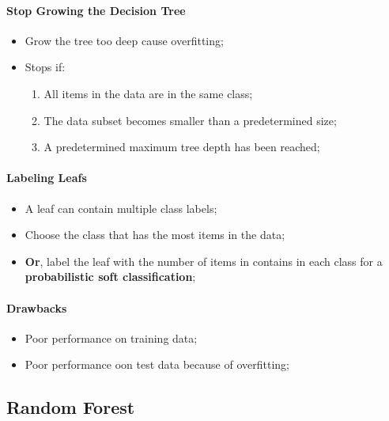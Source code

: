       \paragraph{Stop Growing the Decision Tree}
      \begin{itemize}
        \item Grow the tree too deep cause overfitting;
        \item Stops if:
        \begin{enumerate}
          \item All items in the data are in the same class;
          \item The data subset becomes smaller than a predetermined size;
          \item A predetermined maximum tree depth has been reached;
        \end{enumerate}
      \end{itemize}
      
      \paragraph{Labeling Leafs}
      \begin{itemize}
        \item A leaf can contain multiple class labels;
        \item Choose the class that has the most items in the data;
        \item \textbf{Or}, label the leaf with the number of items in contains in each class for a \textbf{probabilistic soft classification};
      \end{itemize}
      
      \paragraph{Drawbacks}
      \begin{itemize}
        \item Poor performance on training data;
        \item Poor performance oon test data because of overfitting;
      \end{itemize}
      
  \subsection{Random Forest}
  
